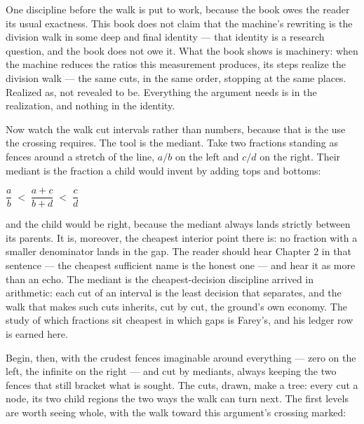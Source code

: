 One discipline before the walk is put to work, because the book owes the reader its
usual exactness. This book does not claim that the machine's rewriting is the division
walk in some deep and final identity --- that identity is a research question, and the
book does not owe it. What the book shows is machinery: when the machine reduces the
ratios this measurement produces, its steps realize the division walk --- the same
cuts, in the same order, stopping at the same places. Realized as, not revealed to be.
Everything the argument needs is in the realization, and nothing in the identity.

Now watch the walk cut intervals rather than numbers, because that is the use the
crossing requires. The tool is the mediant. Take two fractions standing as fences
around a stretch of the line, $a/b$ on the left and $c/d$ on the right. Their mediant
is the fraction a child would invent by adding tops and bottoms:

\begin{center}
$\dfrac{a}{b} \;<\; \dfrac{a+c}{b+d} \;<\; \dfrac{c}{d}$
\end{center}

and the child would be right, because the mediant always lands strictly between its
parents. It is, moreover, the cheapest interior point there is: no fraction with a
smaller denominator lands in the gap. The reader should hear Chapter 2 in that
sentence --- the cheapest sufficient name is the honest one --- and hear it as more
than an echo. The mediant is the cheapest-decision discipline arrived in arithmetic:
each cut of an interval is the least decision that separates, and the walk that makes
such cuts inherits, cut by cut, the ground's own economy. The study of which fractions
sit cheapest in which gaps is Farey's, and his ledger row is earned here.

Begin, then, with the crudest fences imaginable around everything --- zero on the
left, the infinite on the right --- and cut by mediants, always keeping the two fences
that still bracket what is sought. The cuts, drawn, make a tree: every cut a node,
its two child regions the two ways the walk can turn next. The first levels are worth
seeing whole, with the walk toward this argument's crossing marked:

